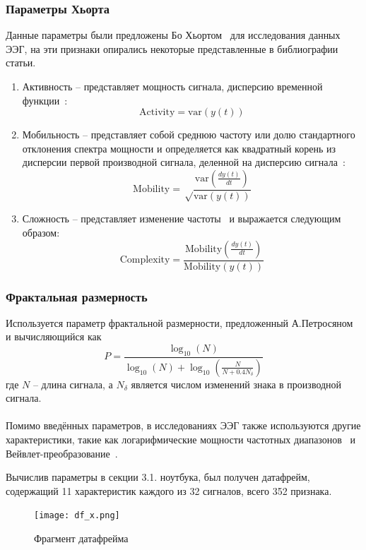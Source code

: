 \documentclass{article}
\begin{document}
\subsubsection{Параметры Хьорта}
Данные параметры были предложены Бо Хьортом~\cite{Hjorth} для исследования данных ЭЭГ, на эти признаки опирались некоторые представленные в библиографии статьи.
\begin{enumerate}
\item Активность -- представляет мощность сигнала, дисперсию временной функции~\cite{Hjorth_defs}:
$$\text{Activity}  =  \text{var}(y(t))$$

\item Мобильность -- представляет собой среднюю частоту или долю стандартного отклонения спектра мощности и определяется как квадратный корень из дисперсии первой производной сигнала, деленной на дисперсию сигнала~\cite{Hjorth_defs}:
$$\text{Mobility} =\sqrt\frac{{\text{var}(\frac{dy(t)}{dt})}}{\text{var}(y(t))}$$

\item Сложность -- представляет изменение частоты~\cite{Hjorth_defs} и выражается следующим образом:
$$\text{Complexity} =\frac{{\text{Mobility}(\frac{dy(t)}{dt})}}{\text{Mobility}(y(t))}$$
\end{enumerate}
\subsubsection{Фрактальная размерность}
Используется параметр фрактальной размерности, предложенный А.Петросяном~\cite{Petrosian} и вычисляющийся как
$$P = \frac{\log_{10}(N)}{\log_{10}(N) +
\log_{10}(\frac{N}{N+0.4N_{\delta}})}$$
где $N$ -- длина сигнала, а $N_{\delta}$ является числом изменений знака в производной сигнала.

\paragraph{} Помимо введённых параметров, в исследованиях ЭЭГ также используются другие характеристики, такие как логарифмические мощности частотных диапазонов~\cite{Brunner} и Вейвлет-преобразование~\cite{Petrantonakis}.

Вычислив параметры в секции 3.1. ноутбука, был получен датафрейм, содержащий 11 характеристик каждого из 32 сигналов, всего 352 признака.

\begin{figure}[h]
\centering
\texttt{[image: df\_x.png]}
\caption{Фрагмент датафрейма}
\end{figure}
\end{document}
